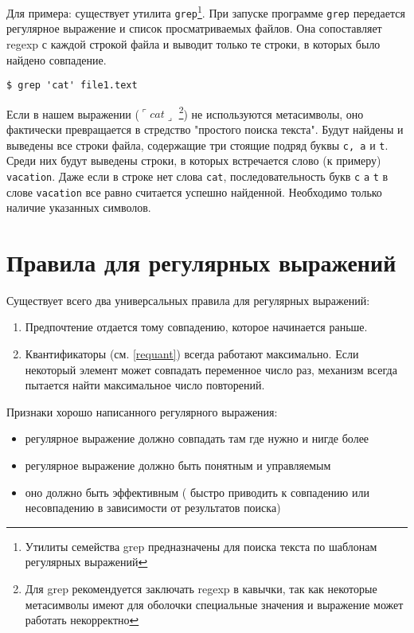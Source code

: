 Для примера: существует утилита \verb+grep+\footnote{Утилиты семейства grep предназначены для поиска текста по шаблонам регулярных выражений}. При запуске программе \verb+grep+ передается регулярное выражение и список просматриваемых файлов. Она сопоставляет regexp с каждой строкой файла и выводит только те строки, в которых было найдено совпадение.
\begin{verbatim}
$ grep 'cat' file1.text 
\end{verbatim}
Если в нашем выражении ($\ulcorner cat \lrcorner$ \footnote{Для grep рекомендуется заключать regexp в кавычки, так как некоторые метасимволы имеют для оболочки специальные значения и выражение может работать некорректно}) не используются метасимволы, оно фактически превращается в стредство "простого поиска текста". Будут найдены и выведены все строки файла, содержащие три стоящие подряд буквы \verb+c, a+ и \verb+t+. Среди них будут выведены строки, в которых встречается слово (к примеру) \verb+vacation+. Даже если в строке нет слова \verb+cat+, последовательность букв \verb+c+ \verb+a+ \verb+t+ в слове \verb+vacation+ все равно считается успешно найденной. Необходимо только наличие указанных символов.

\section{Правила для регулярных выражений}

Существует всего два универсальных правила для регулярных выражений:
\begin{enumerate}
\item Предпочтение отдается тому совпадению, которое начинается раньше.
\item Квантификаторы (см. \ref{requant}) всегда работают максимально. Если некоторый элемент может совпадать переменное число раз, механизм всегда пытается найти максимальное число повторений.
\end{enumerate}

Признаки хорошо написанного регулярного выражения:
\begin{itemize}
\item регулярное выражение должно совпадать там где нужно и нигде более
\item регулярное выражение должно быть понятным и управляемым
\item оно должно быть эффективным ( быстро приводить к совпадению или несовпадению в зависимости от результатов поиска)
\end{itemize}


